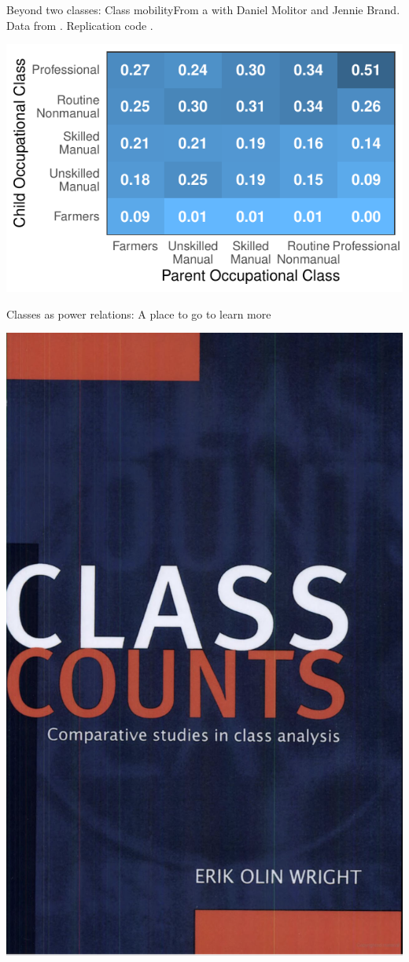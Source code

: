 \documentclass{beamer}
\newcommand\bref[2]{\href{#1}{\color{blue}{#2}}}
\begin{document}
\begin{frame}{Beyond two classes: Class mobility}{From a \bref{https://osf.io/rkw3e}{working paper} with Daniel Molitor and Jennie Brand.\\Data from \bref{https://www.bls.gov/nls/nlsy79.htm}{NLSY79}. Replication code \bref{https://github.com/ilundberg/replication/tree/master/causalmobility}{here}.}

\includegraphics[width = .8\textwidth]{classes_unconditional}

\end{frame}

\begin{frame}{Classes as power relations: A place to go to learn more}

\href{https://www.cambridge.org/core/books/class-counts/E3354F3B204FDFCE9696C2BE5698C959}{\includegraphics[width = .45\textwidth]{wright}}

\end{frame}
\end{document}
